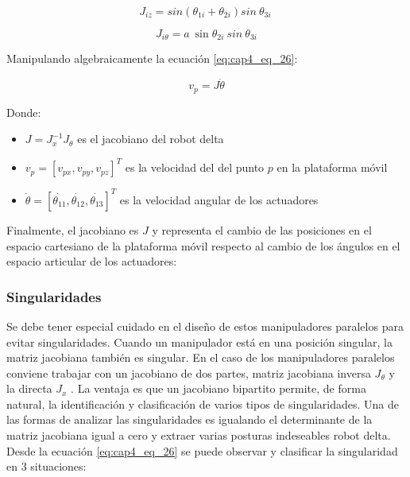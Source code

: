     \begin{equation}
          J_{iz}=sin \left(  \theta _{1i}+ \theta _{2i} \right) sin~ \theta _{3i}~  
          \label{eq:cap4_eq_30}
    \end{equation}
    \vspace{-3.5em}

    \begin{equation}
         J_{i \theta }=a~\sin  \theta _{2i}~sin~ \theta _{3i}
         \label{eq:cap4_eq_31}
    \end{equation}
         \vspace{-1em}
   
    Manipulando algebraicamente la ecuación \ref{eq:cap4_eq_26}:
    
     \begin{equation}
        v_{p}=J\dot{ \theta }
        \label{eq:cap4_eq_32}
    \end{equation}   
    
         Donde: 

        \begin{itemize}
            \item {$J=J_{x}^{-1}J_{ \theta }$  es el jacobiano del robot delta
}
            \item {$v_{p}= \left[ v_{px},v_{py},v_{pz} \right] ^{T}$ es la velocidad del del punto  $p$ en la plataforma móvil
}
            \item {$\dot{ \theta }= \left[ \dot{ \theta _{11}},\dot{ \theta _{12}},\dot{ \theta _{13}}  \right] ^{T}$  es la velocidad angular de los actuadores
}
        \end{itemize}

    Finalmente, el jacobiano es $J$ y representa el cambio de las posiciones en el espacio cartesiano de la plataforma móvil respecto al cambio de los ángulos en el espacio articular de los actuadores:
        


        
        \newpage

        
        \subsubsection{Singularidades}\label{CAP4_SINGULARIDAD}
        
        Se debe tener especial cuidado en el diseño de estos manipuladores paralelos para evitar singularidades. Cuando un manipulador está en una posición singular, la matriz jacobiana también es singular. En el caso de los manipuladores paralelos conviene trabajar con un jacobiano de dos partes, matriz jacobiana inversa   $J_{ \theta }$  y la directa  $ J_{x} $ . La ventaja es que un jacobiano bipartito permite, de forma natural, la identificación y clasificación de varios tipos de singularidades. Una de las formas de analizar las singularidades es igualando el determinante de la matriz jacobiana igual a cero y extraer varias posturas indeseables robot delta. Desde la ecuación \ref{eq:cap4_eq_26} se puede observar y clasificar la singularidad en 3 situaciones:
        
